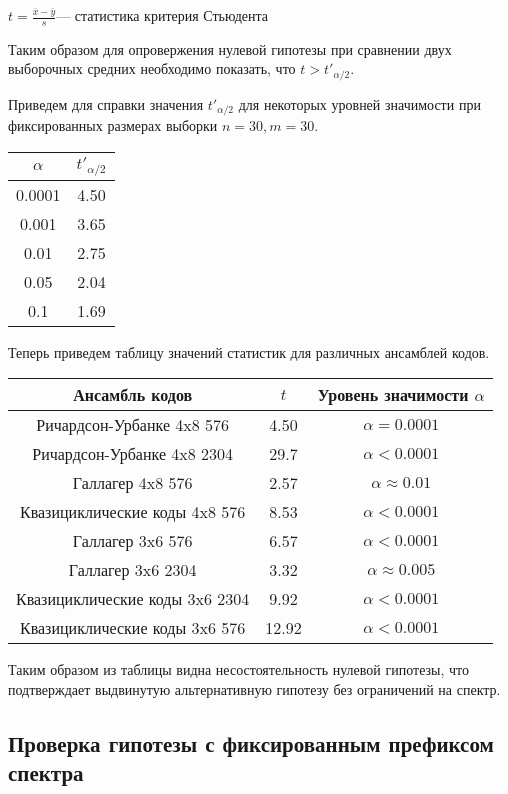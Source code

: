 $t=\frac{\overline{x}-\overline{y}}{s}$--- статистика критерия Стьюдента

Таким образом для опровержения нулевой гипотезы при сравнении двух выборочных средних необходимо
показать, что $t > t'_{\alpha/2}$.

Приведем для справки значения $t'_{\alpha/2}$ для некоторых уровней значимости при фиксированных
размерах выборки $n=30, m=30$.

\begin{tabular}{|c|c|}
	\hline
	$\alpha$ & $t'_{\alpha/2}$ \\
	\hline
	0.0001 & 4.50 \\
	\hline
	0.001 & 3.65 \\
	\hline
	0.01 & 2.75 \\
	\hline
	0.05 & 2.04 \\
	\hline
	0.1 & 1.69 \\
	\hline
\end{tabular}

Теперь приведем таблицу значений статистик для различных ансамблей кодов.

\begin{tabular}{|c|c|c|}
	\hline
	Ансамбль кодов & $t$ & Уровень значимости $\alpha$\\
	\hline
	Ричардсон-Урбанке 4x8 576 & 4.50 &  $\alpha = 0.0001$\\
	\hline
	Ричардсон-Урбанке 4x8 2304 & 29.7 & $\alpha < 0.0001$ \\
	\hline
	Галлагер 4x8 576 & 2.57 & $\alpha \approx 0.01$ \\
	\hline
	Квазициклические коды 4x8 576 & 8.53 & $\alpha < 0.0001$ \\
	\hline
	Галлагер 3x6 576 & 6.57 & $\alpha < 0.0001$ \\
	\hline
	Галлагер 3x6 2304 & 3.32 & $\alpha \approx 0.005$ \\
	\hline
	Квазициклические коды 3x6 2304 & 9.92 & $\alpha < 0.0001$ \\
	\hline
	Квазициклические коды 3x6 576 & 12.92 & $\alpha < 0.0001$ \\
	\hline
\end{tabular}

Таким образом из таблицы видна несостоятельность нулевой гипотезы, что подтверждает выдвинутую альтернативную
гипотезу без ограничений на спектр.

\subsection{Проверка гипотезы с фиксированным префиксом спектра}

